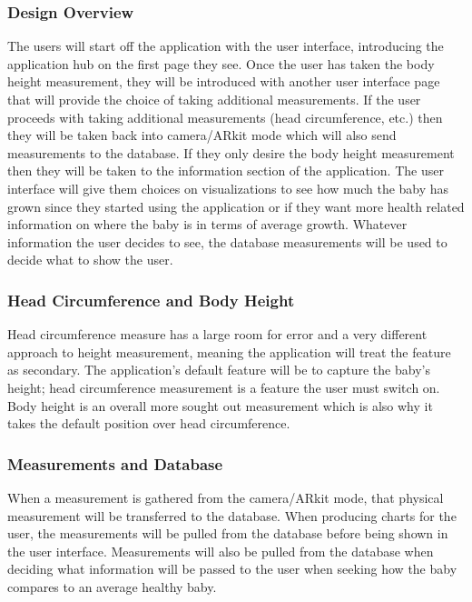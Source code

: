 \documentclass[onecolumn, draftclsnofoot,10pt, compsoc]{IEEEtran}
\begin{document}
\subsubsection{Design Overview}

The users will start off the application with the user interface, introducing the application hub on the first page they see. Once the user has taken the body height measurement, they will be introduced with another user interface page that will provide the choice of taking additional measurements. If the user proceeds with taking additional measurements (head circumference, etc.) then they will be taken back into camera/ARkit mode which will also send measurements to the database. If they only desire the body height measurement then they will be taken to the information section of the application. The user interface will give them choices on visualizations to see how much the baby has grown since they started using the application or if they want more health related information on where the baby is in terms of average growth. Whatever information the user decides to see, the database measurements will be used to decide what to show the user.

\subsubsection{Head Circumference and Body Height}

Head circumference measure has a large room for error and a very different approach to height measurement, meaning the application will treat the feature as secondary. The application's default feature will be to capture the baby's height; head circumference measurement is a feature the user must switch on. Body height is an overall more sought out measurement which is also why it takes the default position over head circumference.



\subsubsection{Measurements and Database}
When a measurement is gathered from the camera/ARkit mode, that physical measurement will be transferred to the database. When producing charts for the user, the measurements will be pulled from the database before being shown in the user interface. Measurements will also be pulled from the database when deciding what information will be passed to the user when seeking how the baby compares to an average healthy baby.
\end{document}
